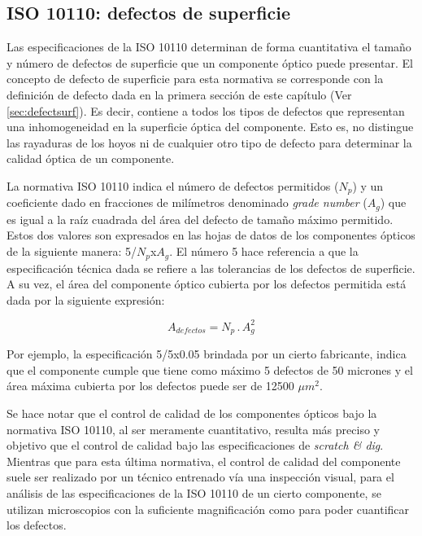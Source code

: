 \singlespacing
\subsection*{ISO 10110: defectos de superficie}


\hspace{0.5cm}Las especificaciones de la ISO 10110 determinan de forma cuantitativa el tamaño y número de defectos de superficie que un componente óptico puede presentar. El concepto de defecto de superficie para esta normativa se corresponde con la definición de defecto dada en la primera sección de este capítulo (Ver \ref{sec:defectsurf}). Es decir, contiene a todos los tipos de defectos que representan una inhomogeneidad en la superficie óptica del componente. Esto es, no distingue las rayaduras de los hoyos ni de cualquier otro tipo de defecto para determinar la calidad óptica de un componente.

La normativa ISO 10110 indica el número de defectos permitidos ($N_{p}$) y un coeficiente dado en fracciones de milímetros denominado \textit{grade number} ($A_{g}$) que es igual a la raíz cuadrada del área del defecto de tamaño máximo permitido. Estos dos valores son expresados en las hojas de datos de los componentes ópticos de la siguiente manera: 5/$N_{p}$x$A_{g}$. El número 5 hace referencia a que la especificación técnica dada se refiere a las tolerancias de los defectos de superficie. A su vez, el área del componente óptico cubierta por los defectos permitida está dada por la siguiente expresión:

\begin{equation}
A_{defectos} = N_{p}\hspace{2pt} .\hspace{2pt} A_{g}^{2}
\end{equation}

Por ejemplo, la especificación 5/5x0.05 brindada por un cierto fabricante, indica que el componente cumple que tiene como máximo 5 defectos de 50 micrones y el área máxima cubierta por los defectos puede ser de 12500 $\mu m^{2}$.

Se hace notar que el control de calidad de los componentes ópticos bajo la normativa ISO 10110, al ser meramente cuantitativo, resulta más preciso y objetivo que el control de calidad bajo las especificaciones de \textit{scratch \& dig}. Mientras que para esta última normativa, el control de calidad del componente suele ser realizado por un técnico entrenado vía una inspección visual, para el análisis de las especificaciones de la ISO 10110 de un cierto componente, se utilizan microscopios con la suficiente magnificación como para poder cuantificar los defectos.

